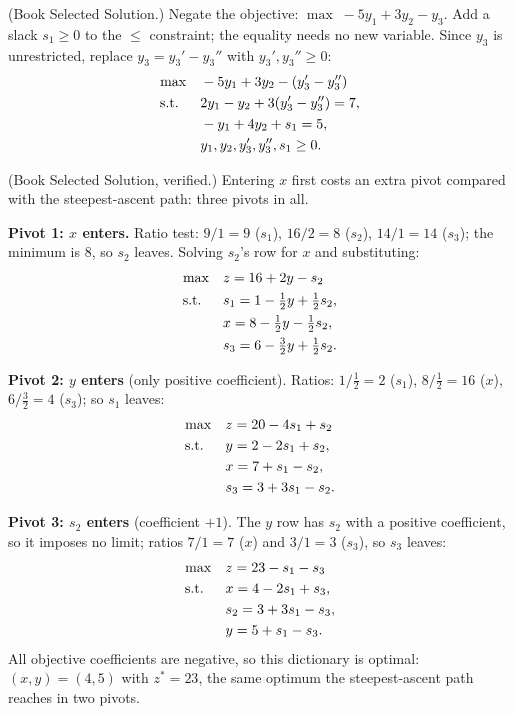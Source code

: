 
(Book Selected Solution.) Negate the objective:
$\max\; -5y_1 + 3y_2 - y_3$. Add a slack $s_1 \geq 0$ to the $\leq$
constraint; the equality needs no new variable. Since $y_3$ is
unrestricted, replace $y_3 = y_3' - y_3''$ with $y_3', y_3'' \geq 0$:
\[
\begin{aligned}
\max \quad & -5y_1 + 3y_2 - (y_3' - y_3'') \\
\text{s.t.}\;\; \quad & 2y_1 - y_2 + 3(y_3' - y_3'') = 7, \\
& -y_1 + 4y_2 + s_1 = 5, \\
& y_1, y_2, y_3', y_3'', s_1 \geq 0.
\end{aligned}
\]


(Book Selected Solution, verified.) Entering $x$ first costs an extra
pivot compared with the steepest-ascent path: three pivots in all.

\textbf{Pivot 1: $x$ enters.} Ratio test: $9/1 = 9$ ($s_1$),
$16/2 = 8$ ($s_2$), $14/1 = 14$ ($s_3$); the minimum is $8$, so $s_2$
leaves. Solving $s_2$'s row for $x$ and substituting:
\[
\begin{aligned}
\max\quad & z = 16 + 2y - s_2 \\
\text{s.t.}\;\;\quad & s_1 = 1 - \tfrac12 y + \tfrac12 s_2, \\
& x = 8 - \tfrac12 y - \tfrac12 s_2, \\
& s_3 = 6 - \tfrac32 y + \tfrac12 s_2.
\end{aligned}
\]

\textbf{Pivot 2: $y$ enters} (only positive coefficient). Ratios:
$1/\tfrac12 = 2$ ($s_1$), $8/\tfrac12 = 16$ ($x$), $6/\tfrac32 = 4$
($s_3$); so $s_1$ leaves:
\[
\begin{aligned}
\max\quad & z = 20 - 4s_1 + s_2 \\
\text{s.t.}\;\;\quad & y = 2 - 2s_1 + s_2, \\
& x = 7 + s_1 - s_2, \\
& s_3 = 3 + 3s_1 - s_2.
\end{aligned}
\]

\textbf{Pivot 3: $s_2$ enters} (coefficient $+1$). The $y$ row has $s_2$
with a positive coefficient, so it imposes no limit; ratios $7/1 = 7$
($x$) and $3/1 = 3$ ($s_3$), so $s_3$ leaves:
\[
\begin{aligned}
\max\quad & z = 23 - s_1 - s_3 \\
\text{s.t.}\;\;\quad & x = 4 - 2s_1 + s_3, \\
& s_2 = 3 + 3s_1 - s_3, \\
& y = 5 + s_1 - s_3.
\end{aligned}
\]
All objective coefficients are negative, so this dictionary is optimal:
$(x, y) = (4, 5)$ with $z^* = 23$, the same optimum the steepest-ascent
path reaches in two pivots.


